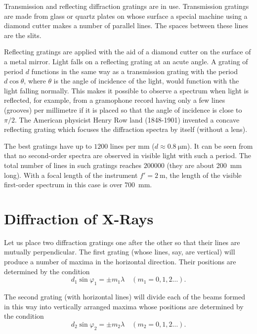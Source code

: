 Transmission and reflecting diffraction gratings are in use.
Transmission gratings are made from glass or quartz plates on whose surface a special machine using a diamond cutter makes a number of parallel lines.
The spaces between these lines are the slits.

Reflecting gratings are applied with the aid of a diamond cutter on the surface of a metal mirror.
Light falls on a reflecting grating at an acute angle.
A grating of period $d$ functions in the same way
as a transmission grating with the period $d\cos\theta$, where $\theta$ is the angle of incidence of the light, would function with the light falling normally. This makes it possible to observe a spectrum when light is reflected, for example, from a gramophone record having only
a few lines (grooves) per millimetre if it is placed so that the angle of incidence is close to $\pi/2$.
The American physicist Henry Row land (1848-1901) invented a concave reflecting grating which focuses the diffraction spectra by itself (without a lens).

The best gratings have up to $1200$ lines per mm ($d\approx\SI{0.8}{\micro\metre}$).
It can be seen from  that no second-order spectra are observed in visible light with such a period.
The total number of lines in such gratings reaches $200000$ (they are about \SI{200}{\milli\metre} long).
With a focal length of the instrument $f'=\SI{2}{\metre}$, the length of the visible first-order spectrum in this case is over \SI{700}{\milli\metre}.

\section{Diffraction of X-Rays}\label{sec:18_7}

Let us place two diffraction gratings one after the other so that their lines are mutually perpendicular.
The first grating (whose lines, say, are vertical) will produce a number of maxima in the horizontal direction.
Their positions are determined by the condition
\begin{equation}\label{eq:18_56}
	d_1 \sin\varphi_1 = \pm m_1 \lambda \quad (m_1=0,1,2\ldots).
\end{equation}

\noindent
The second grating (with horizontal lines) will divide each of the beams formed in this way into vertically arranged maxima whose positions are determined by the condition
\begin{equation}\label{eq:18_57}
	d_2 \sin\varphi_2 = \pm m_2 \lambda \quad (m_2=0,1,2\ldots).
\end{equation}

